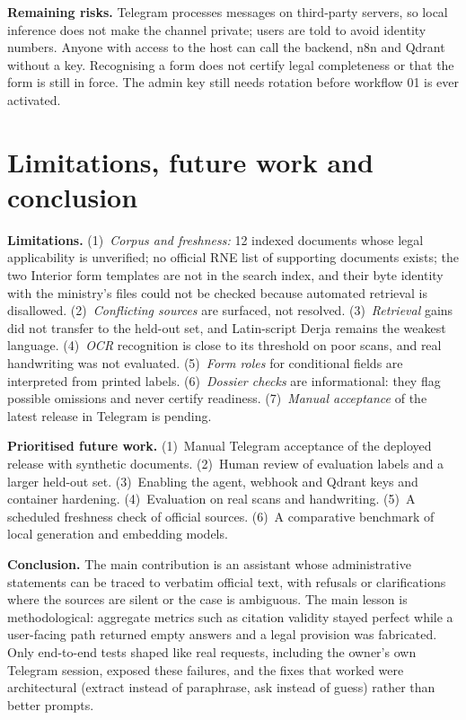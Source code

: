 \documentclass[10pt,a4paper]{article}
\begin{document}
\textbf{Remaining risks.} Telegram processes messages on third-party servers, so local inference does not make
the channel private; users are told to avoid identity numbers. Anyone with access to the host can call the
backend, n8n and Qdrant without a key. Recognising a form does not certify legal completeness or that the form
is still in force. The admin key still needs rotation before workflow 01 is ever activated.

\section{Limitations, future work and conclusion}\label{sec:conclusion}
\textbf{Limitations.} (1)~\emph{Corpus and freshness:} 12 indexed documents whose legal applicability is
unverified; no official RNE list of supporting documents exists; the two Interior form templates are not in the
search index, and their byte identity with the ministry's files could not be checked because automated retrieval
is disallowed. (2)~\emph{Conflicting sources} are surfaced, not resolved. (3)~\emph{Retrieval} gains did not
transfer to the held-out set, and Latin-script Derja remains the weakest language. (4)~\emph{OCR} recognition
is close to its threshold on poor scans, and real handwriting was not evaluated. (5)~\emph{Form roles} for
conditional fields are interpreted from printed labels. (6)~\emph{Dossier checks} are informational: they flag
possible omissions and never certify readiness. (7)~\emph{Manual acceptance} of the latest release in Telegram is
pending.

\textbf{Prioritised future work.} (1)~Manual Telegram acceptance of the deployed release with synthetic
documents. (2)~Human review of evaluation labels and a larger held-out set. (3)~Enabling the agent, webhook and
Qdrant keys and container hardening. (4)~Evaluation on real scans and handwriting. (5)~A scheduled freshness
check of official sources. (6)~A comparative benchmark of local generation and embedding models.

\textbf{Conclusion.} The main contribution is an assistant whose administrative statements can be traced to
verbatim official text, with refusals or clarifications where the sources are silent or the case is ambiguous.
The main lesson is methodological: aggregate metrics such as citation validity stayed perfect while a user-facing
path returned empty answers and a legal provision was fabricated. Only end-to-end tests shaped like real
requests, including the owner's own Telegram session, exposed these failures, and the fixes that worked were
architectural (extract instead of paraphrase, ask instead of guess) rather than better prompts.
\end{document}
